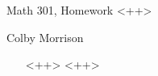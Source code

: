\documentclass[12pt, twoside]{amsart}
\begin{document}
\centerline{\large \sc Math 301, Homework <++> }
\centerline{\large  Colby Morrison}
\begin{enumerate}
  \item[<++>] <++>
\end{enumerate}
\end{document}
